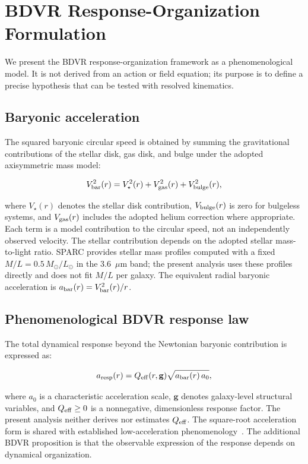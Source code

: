 \documentclass[11pt]{article}
\begin{document}
\section{BDVR Response-Organization Formulation}

We present the BDVR response-organization framework as a phenomenological model. It is not derived from an action or field equation; its purpose is to define a precise hypothesis that can be tested with resolved kinematics.

\subsection{Baryonic acceleration}

The squared baryonic circular speed is obtained by summing the gravitational contributions of the stellar disk, gas disk, and bulge under the adopted axisymmetric mass model:

\begin{equation}
V_{\rm bar}^{2}(r) = V_\star^{2}(r) + V_{\rm gas}^{2}(r) + V_{\rm bulge}^{2}(r),
\label{eq:vbar}
\end{equation}

where $V_\star(r)$ denotes the stellar disk contribution, $V_{\rm bulge}(r)$ is zero for bulgeless systems, and $V_{\rm gas}(r)$ includes the adopted helium correction where appropriate. Each term is a model contribution to the circular speed, not an independently observed velocity. The stellar contribution depends on the adopted stellar mass-to-light ratio. SPARC provides stellar mass profiles computed with a fixed $M/L = 0.5\,M_\odot/L_\odot$ in the 3.6~$\mu$m band; the present analysis uses these profiles directly and does not fit $M/L$ per galaxy. The equivalent radial baryonic acceleration is $a_{\rm bar}(r) = V_{\rm bar}^{2}(r)/r$.

\subsection{Phenomenological BDVR response law}

The total dynamical response beyond the Newtonian baryonic contribution is expressed as:

\begin{equation}
a_{\rm resp}(r) = Q_{\rm eff}(r, \mathbf{g}) \sqrt{a_{\rm bar}(r) \, a_{0}},
\label{eq:aresp}
\end{equation}

where $a_{0}$ is a characteristic acceleration scale, $\mathbf{g}$ denotes galaxy-level structural variables, and $Q_{\rm eff} \geq 0$ is a nonnegative, dimensionless response factor. The present analysis neither derives nor estimates $Q_{\rm eff}$. The square-root acceleration form is shared with established low-acceleration phenomenology~\cite{mcGaugh2004, famaey2012}. The additional BDVR proposition is that the observable expression of the response depends on dynamical organization.
\end{document}
